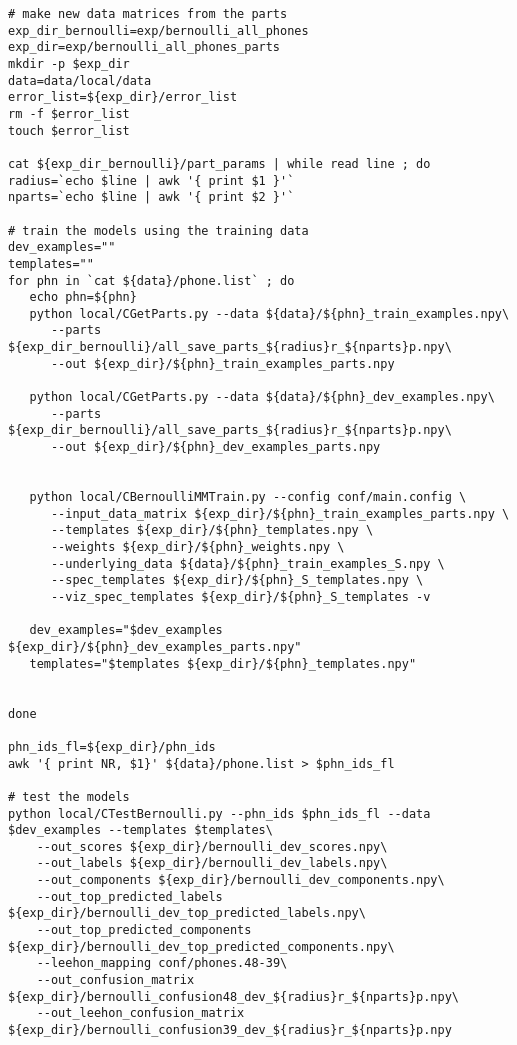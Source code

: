 \documentclass{article}
\begin{document}
\begin{verbatim}
# make new data matrices from the parts
exp_dir_bernoulli=exp/bernoulli_all_phones
exp_dir=exp/bernoulli_all_phones_parts
mkdir -p $exp_dir
data=data/local/data
error_list=${exp_dir}/error_list
rm -f $error_list
touch $error_list

cat ${exp_dir_bernoulli}/part_params | while read line ; do
radius=`echo $line | awk '{ print $1 }'`
nparts=`echo $line | awk '{ print $2 }'`

# train the models using the training data
dev_examples=""
templates=""
for phn in `cat ${data}/phone.list` ; do
   echo phn=${phn}
   python local/CGetParts.py --data ${data}/${phn}_train_examples.npy\
      --parts ${exp_dir_bernoulli}/all_save_parts_${radius}r_${nparts}p.npy\
      --out ${exp_dir}/${phn}_train_examples_parts.npy

   python local/CGetParts.py --data ${data}/${phn}_dev_examples.npy\
      --parts ${exp_dir_bernoulli}/all_save_parts_${radius}r_${nparts}p.npy\
      --out ${exp_dir}/${phn}_dev_examples_parts.npy


   python local/CBernoulliMMTrain.py --config conf/main.config \
      --input_data_matrix ${exp_dir}/${phn}_train_examples_parts.npy \
      --templates ${exp_dir}/${phn}_templates.npy \
      --weights ${exp_dir}/${phn}_weights.npy \
      --underlying_data ${data}/${phn}_train_examples_S.npy \
      --spec_templates ${exp_dir}/${phn}_S_templates.npy \
      --viz_spec_templates ${exp_dir}/${phn}_S_templates -v

   dev_examples="$dev_examples ${exp_dir}/${phn}_dev_examples_parts.npy"
   templates="$templates ${exp_dir}/${phn}_templates.npy"


done

phn_ids_fl=${exp_dir}/phn_ids
awk '{ print NR, $1}' ${data}/phone.list > $phn_ids_fl

# test the models
python local/CTestBernoulli.py --phn_ids $phn_ids_fl --data $dev_examples --templates $templates\
    --out_scores ${exp_dir}/bernoulli_dev_scores.npy\
    --out_labels ${exp_dir}/bernoulli_dev_labels.npy\
    --out_components ${exp_dir}/bernoulli_dev_components.npy\
    --out_top_predicted_labels ${exp_dir}/bernoulli_dev_top_predicted_labels.npy\
    --out_top_predicted_components ${exp_dir}/bernoulli_dev_top_predicted_components.npy\
    --leehon_mapping conf/phones.48-39\
    --out_confusion_matrix ${exp_dir}/bernoulli_confusion48_dev_${radius}r_${nparts}p.npy\
    --out_leehon_confusion_matrix ${exp_dir}/bernoulli_confusion39_dev_${radius}r_${nparts}p.npy


\end{verbatim}
\end{document}
